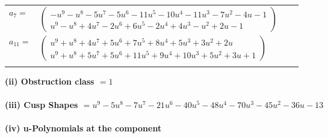 \documentclass[1p]{elsarticle_modified}
\theoremstyle{definition}
\begin{document}
\begin{tabular}{m{7pt} m{180pt} m{7pt} m{180pt} }
\flushright $a_{7}=$&$\begin{pmatrix}- u^9- u^8-5 u^7-5 u^6-11 u^5-10 u^4-11 u^3-7 u^2-4 u-1\\u^9- u^8+4 u^7-2 u^6+6 u^5-2 u^4+4 u^3- u^2+2 u-1\end{pmatrix}$ \\
\flushright $a_{11}=$&$\begin{pmatrix}u^9+u^8+4 u^7+5 u^6+7 u^5+8 u^4+5 u^3+3 u^2+2 u\\u^9+u^8+5 u^7+5 u^6+11 u^5+9 u^4+10 u^3+5 u^2+3 u+1\end{pmatrix}$\\&\end{tabular}
\flushleft \textbf{(ii) Obstruction class $= 1$}\\~\\
\flushleft \textbf{(iii) Cusp Shapes $= u^9-5 u^8-7 u^7-21 u^6-40 u^5-48 u^4-70 u^3-45 u^2-36 u-13$}\\~\\
\newpage\renewcommand{\arraystretch}{1}
\flushleft \textbf{(iv) u-Polynomials at the component}\newline \\
\end{document}

